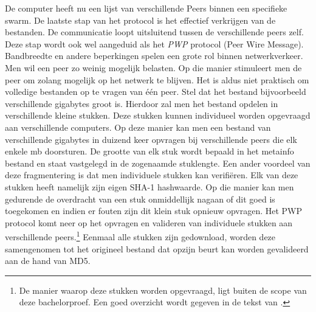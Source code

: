 De computer heeft nu een lijst van verschillende Peers binnen een specifieke swarm. De laatste stap van het protocol is het effectief verkrijgen van de bestanden. De communicatie loopt uitsluitend tussen de verschillende peers zelf. Deze stap wordt ook wel aangeduid als het \textit{PWP} protocol (Peer Wire Message). Bandbreedte en andere beperkingen spelen een grote rol binnen netwerkverkeer. Men wil een peer zo weinig mogelijk belasten. Op die manier stimuleert men de peer om zolang mogelijk op het netwerk te blijven. Het is aldus niet praktisch om volledige bestanden op te vragen van één peer. Stel dat het bestand bijvoorbeeld verschillende gigabytes groot is. Hierdoor zal men het bestand opdelen in verschillende kleine stukken. Deze stukken kunnen individueel worden opgevraagd aan verschillende computers. Op deze manier kan men een bestand van verschillende gigabytes in duizend keer opvragen bij verschillende peers die elk enkele mb doorsturen. De grootte van elk stuk wordt bepaald in het metainfo bestand en staat vastgelegd in de zogenaamde stuklengte. Een ander voordeel van deze fragmentering is dat men individuele stukken kan verifiëren. Elk van deze stukken heeft namelijk zijn eigen SHA-1 hashwaarde. Op die manier kan men gedurende de overdracht van een stuk onmiddellijk nagaan of dit goed is toegekomen en indien er fouten zijn dit klein stuk opnieuw opvragen. Het PWP protocol komt neer op het opvragen en valideren van individuele stukken aan verschillende peers.\footnote{De manier waarop deze stukken worden opgevraagd, ligt buiten de scope van deze bachelorproef. Een goed overzicht wordt gegeven in de tekst van \textcite{Fonseca2005}.} Eenmaal alle stukken zijn gedownload, worden deze samengenomen tot het origineel bestand dat opzijn beurt kan worden gevalideerd aan de hand van MD5.

